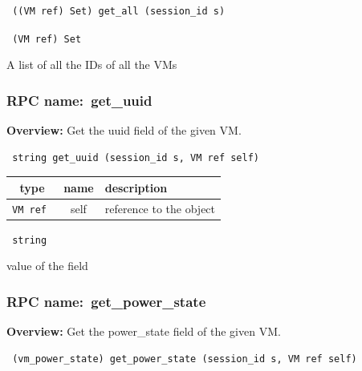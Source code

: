 \begin{verbatim} ((VM ref) Set) get_all (session_id s)\end{verbatim}


\vspace{0.3cm}

{\tt 
(VM ref) Set
}


A list of all the IDs of all the VMs
\vspace{0.3cm}
\vspace{0.3cm}
\vspace{0.3cm}
\subsubsection{RPC name:~get\_uuid}

{\bf Overview:} 
Get the uuid field of the given VM.

\begin{verbatim} string get_uuid (session_id s, VM ref self)\end{verbatim}



 
\vspace{0.3cm}
\begin{tabular}{|c|c|p{7cm}|}
 \hline
{\bf type} & {\bf name} & {\bf description} \\ \hline
{\tt VM ref } & self & reference to the object \\ \hline 

\end{tabular}

\vspace{0.3cm}

{\tt 
string
}


value of the field
\vspace{0.3cm}
\vspace{0.3cm}
\vspace{0.3cm}
\subsubsection{RPC name:~get\_power\_state}

{\bf Overview:} 
Get the power\_state field of the given VM.

\begin{verbatim} (vm_power_state) get_power_state (session_id s, VM ref self)\end{verbatim}


